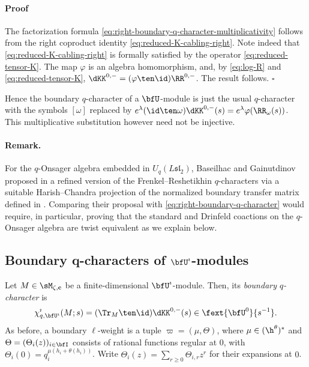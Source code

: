 \documentclass[reqno]{amsart}
\numberwithin{equation}{section}
\newenvironment{pf}{\medskip\paragraph{{\sc Proof}}}{\hfill$\square$\par\medskip}
\newenvironment{remark}{\medskip\paragraph{{\bf Remark.}}}{\par\medskip}
\begin{document}
\begin{pf}
The factorization formula \eqref{eq:right-boundary-q-character-multiplicativity}
follows from the right coproduct identity
\eqref{eq:reduced-K-cabling-right}. Note indeed that \eqref{eq:reduced-K-cabling-right}
is formally satisfied by the operator \eqref{eq:reduced-tensor-K}. 
The map $\varphi$ is an algebra homomorphism, and, by \eqref{eq:log-R} and
\eqref{eq:reduced-tensor-K}, $\dKK^{0,-}=(\varphi\ten\id)\RR^{0,-}$.
The result follows.
\end{pf}

Hence the boundary $q$-character of a $\bfU$-module is just the usual $q$-character 
with the symbols $[\omega]$ replaced by
$e^\lambda(\id\ten\omega)\dKK^{0,-}(s)=e^\lambda\varphi(\RR_\omega(s))$.
This multiplicative substitution however need not be injective.

\begin{remark}
For the $q$-Onsager algebra embedded in $U_q(L\mathfrak{sl}_2)$, 
Baseilhac and Gainutdinov proposed in \cite[Sec.~7]{baseilhac-gainutdinov-26}
a refined version of the  Frenkel--Reshetikhin $q$-characters via a 
suitable Harish--Chandra projection
of the normalized boundary transfer matrix defined in \cite{appel-vlaar-25a}.
Comparing their proposal with \eqref{eq:right-boundary-q-character} would require,
in particular, proving that the standard and Drinfeld coactions on the
$q$-Onsager algebra are twist equivalent as we explain below.
\hfill\rmkend
\end{remark}

\subsection{Boundary q-characters of \texorpdfstring{$\bfU^\imath$}{U-iota}-modules}
\label{ss:boundary-left-trace}

Let $M\in\sM_{\zeta,\mathbf c}$ be a finite-dimensional $\bfU^\imath$-module. Then, its
\emph{boundary $q$-character} is
\begin{equation}\label{eq:left-boundary-q-character}
\chi^\imath_{q,\bfU^\imath}(M;s)=(\Tr_M\ten\id)\dKK^{0,-}(s)
\in\fext{\bfU^0}{s^{-1}}.
\end{equation}
As before, a boundary $\ell$-weight is a tuple $\varpi=(\mu,\Theta)$, where
$\mu\in(\h^\theta)^*$ and $\Theta=(\Theta_i(z))_{i\in\bfI}$ consists of
rational functions regular at $0$, with
$\Theta_i(0)=q_i^{\mu(h_i+\theta(h_i))}$.
Write $\Theta_i(z)=\sum_{r\geq0}\Theta_{i,r} z^{r}$
for their expansions at $0$.
\end{document}

